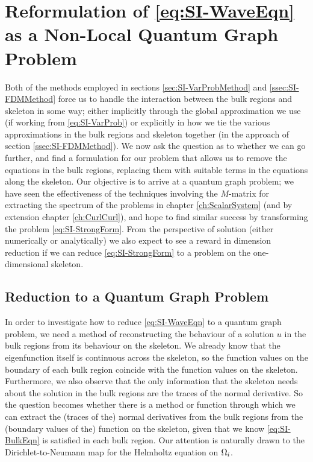 \section{Reformulation of \eqref{eq:SI-WaveEqn} as a Non-Local Quantum Graph Problem} \label{sec:SI-NonLocalQG}
Both of the methods employed in sections \ref{sec:SI-VarProbMethod} and \ref{ssec:SI-FDMMethod} force us to handle the interaction between the bulk regions and skeleton in some way; either implicitly through the global approximation we use (if working from \eqref{eq:SI-VarProb}) or explicitly in how we tie the various approximations in the bulk regions and skeleton together (in the approach of section \ref{ssec:SI-FDMMethod}).
We now ask the question as to whether we can go further, and find a formulation for our problem that allows us to remove the equations in the bulk regions, replacing them with suitable terms in the equations along the skeleton.
Our objective is to arrive at a quantum graph problem; we have seen the effectiveness of the techniques involving the $M$-matrix for extracting the spectrum of the problems in chapter \ref{ch:ScalarSystem} (and by extension chapter \ref{ch:CurlCurl}), and hope to find similar success by transforming the problem \eqref{eq:SI-StrongForm}.
From the perspective of solution (either numerically or analytically) we also expect to see a reward in dimension reduction if we can reduce \eqref{eq:SI-StrongForm} to a problem on the one-dimensional skeleton.

\subsection{Reduction to a Quantum Graph Problem} \label{ssec:SI-ToQG}
In order to investigate how to reduce \eqref{eq:SI-WaveEqn} to a quantum graph problem, we need a method of reconstructing the behaviour of a solution $u$ in the bulk regions from its behaviour on the skeleton.
We already know that the eigenfunction itself is continuous across the skeleton, so the function values on the boundary of each bulk region coincide with the function values on the skeleton.
Furthermore, we also observe that the only information that the skeleton needs about the solution in the bulk regions are the traces of the normal derivative.
So the question becomes whether there is a method or function through which we can extract the (traces of the) normal derivatives from the bulk regions from the (boundary values of the) function on the skeleton, given that we know \eqref{eq:SI-BulkEqn} is satisfied in each bulk region.
Our attention is naturally drawn to the Dirichlet-to-Neumann map for the Helmholtz equation on $\Omega_i$.

